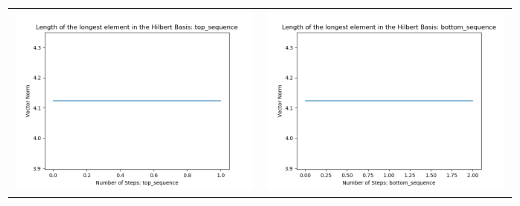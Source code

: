 \documentclass[10pt]{article}
\begin{document}
\begin{tabular}{c|c}
\begin{minipage}{.4\textwidth}
\includegraphics[width=\textwidth]{"DATA/5d/5 generators 2 bound H/top_sequence LENGTH"}
\end{minipage} &
\begin{minipage}{.4\textwidth}
\includegraphics[width=\textwidth]{"DATA/5d/5 generators 2 bound H bottomup/bottom_sequence LENGTH"}
\end{minipage}
\end{tabular}
\end{document}
